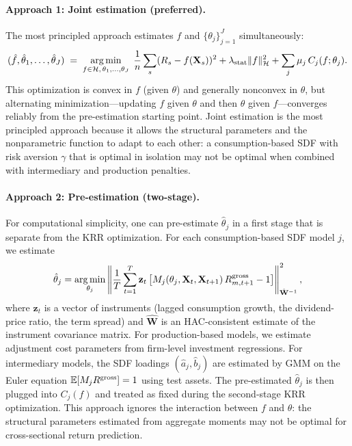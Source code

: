 \paragraph{Approach 1: Joint estimation (preferred).}
The most principled approach estimates $f$ and $\{\theta_j\}_{j=1}^J$ simultaneously:
\begin{equation}\label{eq:joint_estimation}
(\hat{f}, \hat{\theta}_1, \ldots, \hat{\theta}_J) \;=\; \operatorname*{arg\,min}_{f \in \mathcal{H}, \, \theta_1, \ldots, \theta_J} \;
\frac{1}{n}\sum_s (R_s - f(\mathbf{X}_s))^2 + \lambda_{\mathrm{stat}}\|f\|_{\mathcal{H}}^2 + \sum_j \mu_j\, C_j(f; \theta_j).
\end{equation}
This optimization is convex in $f$ (given $\theta$) and generally nonconvex in $\theta$, but alternating minimization---updating $f$ given $\theta$ and then $\theta$ given $f$---converges reliably from the pre-estimation starting point.
Joint estimation is the most principled approach because it allows the structural parameters and the nonparametric function to adapt to each other: a consumption-based SDF with risk aversion $\gamma$ that is optimal in isolation may not be optimal when combined with intermediary and production penalties.

\paragraph{Approach 2: Pre-estimation (two-stage).}
For computational simplicity, one can pre-estimate $\hat{\theta}_j$ in a first stage that is separate from the KRR optimization.
For each consumption-based SDF model $j$, we estimate
\begin{equation}\label{eq:gmm_first_stage}
\hat{\theta}_j = \operatorname*{arg\,min}_{\theta_j} \left\|\frac{1}{T}\sum_{t=1}^{T} \mathbf{z}_t \left[M_j(\theta_j, \mathbf{X}_t, \mathbf{X}_{t+1})\, R_{m,t+1}^{\mathrm{gross}} - 1\right]\right\|_{\hat{\mathbf{W}}^{-1}}^2,
\end{equation}
where $\mathbf{z}_t$ is a vector of instruments (lagged consumption growth, the dividend-price ratio, the term spread) and $\hat{\mathbf{W}}$ is an HAC-consistent estimate of the instrument covariance matrix.
For production-based models, we estimate adjustment cost parameters from firm-level investment regressions.
For intermediary models, the SDF loadings $(\hat{a}_j, \hat{b}_j)$ are estimated by GMM on the Euler equation $\mathbb{E}[M_j R^{\mathrm{gross}}] = 1$ using test assets.
The pre-estimated $\hat{\theta}_j$ is then plugged into $C_j(f)$ and treated as fixed during the second-stage KRR optimization.
This approach ignores the interaction between $f$ and $\theta$: the structural parameters estimated from aggregate moments may not be optimal for cross-sectional return prediction.

